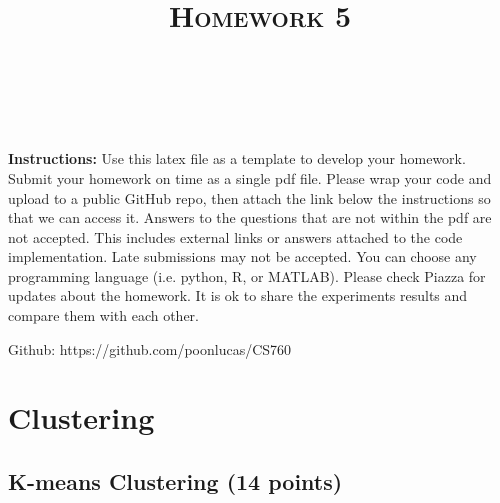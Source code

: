 \documentclass[a4paper]{article}
\title{\textsc{Homework 5}} %
\author{
\red{Lucas Poon} \\
\red{llpoon}\\
}
\date{}
\theoremstyle{definition}
\newenvironment{soln}{
    \leavevmode\color{blue}\ignorespaces
}{}
\begin{document}
\maketitle 


\textbf{Instructions:}
Use this latex file as a template to develop your homework. Submit your homework on time as a single pdf file. Please wrap your code and upload to a public GitHub repo, then attach the link below the instructions so that we can access it. Answers to the questions that are not within the pdf are not accepted. This includes external links or answers attached to the code implementation. Late submissions may not be accepted. You can choose any programming language (i.e. python, R, or MATLAB). Please check Piazza for updates about the homework. It is ok to share the experiments results and compare them with each other. \\

\begin{soln}
    Github: https://github.com/poonlucas/CS760
\end{soln}

\vspace{0.1in}


\section{Clustering}

\subsection{K-means Clustering (14 points)}
\end{document}
